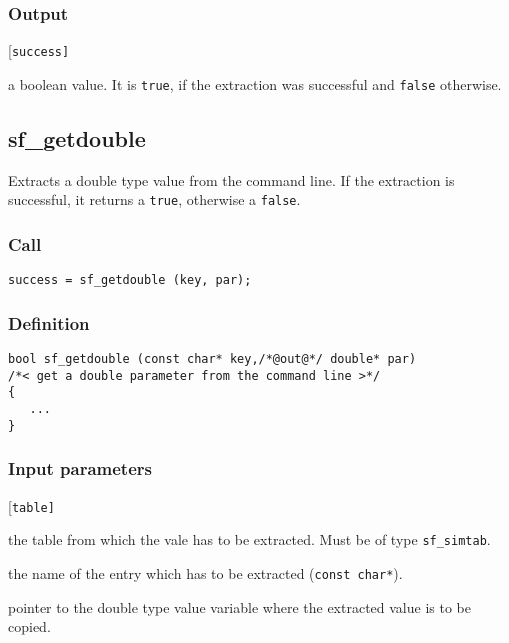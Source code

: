 \subsubsection*{Output}
\begin{desclist}{\tt }{\quad}[\tt success]
   \setlength\itemsep{0pt}
   \item[success]  a boolean value. It is \texttt{true}, if the extraction was successful and \texttt{false} otherwise. 
\end{desclist}




\subsection{{sf\_getdouble}}
Extracts a double type value from the command line. If the extraction is successful, it returns a \texttt{true}, otherwise a \texttt{false}.  

\subsubsection*{Call}
\begin{verbatim}success = sf_getdouble (key, par);\end{verbatim}

\subsubsection*{Definition}
\begin{verbatim}
bool sf_getdouble (const char* key,/*@out@*/ double* par) 
/*< get a double parameter from the command line >*/
{
   ...
}
\end{verbatim}

\subsubsection*{Input parameters}
\begin{desclist}{\tt }{\quad}[\tt table]
   \setlength\itemsep{0pt}
   \item[table] the table from which the vale has to be extracted. Must be of type \texttt{sf\_simtab}. 
   \item[key]   the name of the entry which has to be extracted (\texttt{const char*}).
   \item[par]   pointer to the double type value variable where the extracted value is to be copied.
\end{desclist}

